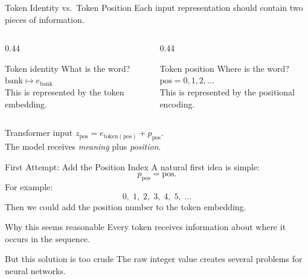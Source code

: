 \documentclass[aspectratio=169]{beamer}
\begin{document}
\begin{frame}{Token Identity vs.\ Token Position}
  Each input representation should contain two pieces of information.

  \vspace{0.4em}
  \begin{columns}[t]
    \begin{column}{0.44\textwidth}
      \begin{block}{Token identity}
        What is the word?\\[0.4em]
        $\mathrm{bank} \mapsto e_{\mathrm{bank}}$\\[0.4em]
        This is represented by the token embedding.
      \end{block}
    \end{column}
    \begin{column}{0.44\textwidth}
      \begin{block}{Token position}
        Where is the word?\\[0.4em]
        $\mathrm{pos} = 0, 1, 2, \ldots$\\[0.4em]
        This is represented by the positional encoding.
      \end{block}
    \end{column}
  \end{columns}

  \vspace{0.6em}
  \begin{block}{Transformer input}
    \centering
    $z_{\mathrm{pos}} = e_{\mathrm{token(pos)}} + p_{\mathrm{pos}}.$\\[0.3em]
    The model receives \emph{meaning} plus \emph{position}.
  \end{block}
\end{frame}
%
%
\begin{frame}{First Attempt: Add the Position Index}
  A natural first idea is simple:
  \[
    p_{\mathrm{pos}} = \mathrm{pos}.
  \]
  For example:
  \[
    0,\;1,\;2,\;3,\;4,\;5,\;\ldots
  \]
  Then we could add the position number to the token embedding.

  \vspace{0.5em}
  \begin{block}{Why this seems reasonable}
    Every token receives information about where it occurs in the sequence.
  \end{block}

  \vspace{0.4em}
  \begin{alertblock}{But this solution is too crude}
    The raw integer value creates several problems for neural networks.
  \end{alertblock}
\end{frame}
\end{document}
